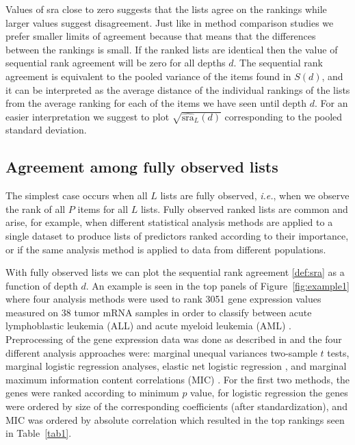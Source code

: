 \documentclass[12pt,a4paper]{article}
\makeatletter
\newcommand{\ie}{\emph{i.e.}\@\xspace}
\theoremstyle{plain}
\makeatother
\begin{document}
Values of \textrm{sra} close to zero suggests that the lists agree on
the rankings while larger values suggest disagreement.  Just like in
method comparison studies we prefer smaller limits of agreement
because that means that the differences between the rankings is
small. If the ranked lists are identical then the value of sequential
rank agreement will be zero for all depths $d$.  The sequential rank
agreement is equivalent to the pooled variance of the items found in
$S(d)$, and it can be interpreted as the average distance of the
individual rankings of the lists from the average ranking for each of
the items we have seen until depth $d$.  For an easier interpretation
we suggest to plot $\sqrt{\widehat{\textrm{sra}}_L(d)}$ corresponding
to the pooled standard deviation.



\subsection{Agreement among fully observed lists}
\label{sec:amfol}

The simplest case occurs when all $L$ lists are fully observed, \ie, when
we observe the rank of all $P$ items for all $L$ lists. Fully
observed ranked lists are common and arise, for example, when
different statistical analysis methods are applied to a single dataset
to produce lists of predictors ranked according to their importance,
or if the same analysis method is applied to data from different
populations.

With fully observed lists we can plot the sequential rank agreement
\eqref{def:sra} as a function of depth $d$. An example is seen in the top
panels of Figure~\ref{fig:example1} where four analysis methods were
used to rank 3051 gene expression values measured on 38 tumor mRNA
samples in order to classify between acute lymphoblastic leukemia
(ALL) and acute myeloid leukemia (AML)
\citep{Golub1999}. Preprocessing of the gene expression data was done
as described in \citet{Dudoit2002} and the four different analysis
approaches were: marginal unequal variances two-sample $t$ tests,
marginal logistic regression analyses, elastic net logistic regression
\citep{friedman2010regularization}, and marginal maximum information
content correlations (MIC) \citep{Reshef2011}. For the first two
methods, the genes were ranked according to minimum $p$ value, for
logistic regression the genes were ordered by size of the
corresponding coefficients (after standardization), and MIC was
ordered by absolute correlation which resulted in the top rankings
seen in Table~\ref{tab1}.
\end{document}
